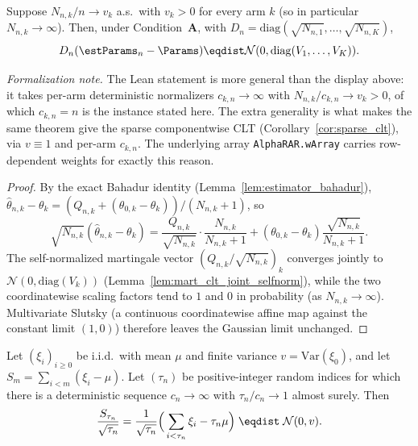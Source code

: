 \begin{corollary}\label{cor:mart_clt_componentwise}
\leanok
{}
Suppose $N_{n,k}/n\to v_k$ a.s.\ with $v_k>0$ for every arm $k$ (so in particular
$N_{n,k}\to\infty$). Then, under Condition~\textbf{A}, with
$D_n=\mathrm{diag}(\sqrt{N_{n,1}},\dots,\sqrt{N_{n,K}})$,
\[
  D_n(\estParams_n-\Params)\eqdist\mathcal{N}(0,\mathrm{diag}(V_1,\dots,V_K)).
\]
\end{corollary}

\emph{Formalization note.} The Lean statement is more general than the display above: it takes
per-arm deterministic normalizers $c_{k,n}\to\infty$ with $N_{n,k}/c_{k,n}\to v_k>0$, of which
$c_{k,n}=n$ is the instance stated here. The extra generality is what makes the same theorem give the
sparse componentwise CLT (Corollary~\ref{cor:sparse_clt}), via $v\equiv1$ and per-arm $c_{k,n}$. The
underlying array \texttt{AlphaRAR.wArray} carries row-dependent weights for exactly this reason.

\begin{proof}\leanok
{}
By the exact Bahadur identity (Lemma~\ref{lem:estimator_bahadur}),
$\hat\theta_{n,k}-\theta_k=(Q_{n,k}+(\theta_{0,k}-\theta_k))/(N_{n,k}+1)$, so
\[
  \sqrt{N_{n,k}}(\hat\theta_{n,k}-\theta_k)
    = \frac{Q_{n,k}}{\sqrt{N_{n,k}}}\cdot\frac{N_{n,k}}{N_{n,k}+1}
      + (\theta_{0,k}-\theta_k)\frac{\sqrt{N_{n,k}}}{N_{n,k}+1}.
\]
The self-normalized martingale vector $(Q_{n,k}/\sqrt{N_{n,k}})_k$ converges jointly to
$\mathcal N(0,\mathrm{diag}(V_k))$ (Lemma~\ref{lem:mart_clt_joint_selfnorm}), while the two
coordinatewise scaling factors tend to $1$ and $0$ in probability (as $N_{n,k}\to\infty$).
Multivariate Slutsky (a continuous coordinatewise affine map against the constant limit $(1,0)$)
therefore leaves the Gaussian limit unchanged.
\end{proof}

\begin{lemma}\label{lem:anscombe_clt}
\leanok
{}
Let $(\xi_i)_{i\ge0}$ be i.i.d.\ with mean $\mu$ and finite variance $v=\mathrm{Var}(\xi_0)$, and let
$S_m=\sum_{i<m}(\xi_i-\mu)$. Let $(\tau_n)$ be positive-integer random indices for which there is a
deterministic sequence $c_n\to\infty$ with $\tau_n/c_n\to1$ almost surely. Then
\[
  \frac{S_{\tau_n}}{\sqrt{\tau_n}}
    = \frac1{\sqrt{\tau_n}}\Big(\sum_{i<\tau_n}\xi_i-\tau_n\mu\Big)
  \;\eqdist\; \mathcal N(0,v).
\]
\end{lemma}

